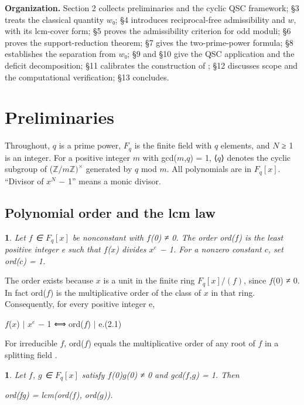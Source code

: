 \documentclass[pdflatex,sn-mathphys-num]{sn-jnl}
\theoremstyle{thmstyleone}
\newcommand{\thmxname}{}
\newtheorem*{thmxinner}{\thmxname}
\newenvironment{thmx}[1]{\renewcommand{\thmxname}{#1}\begin{thmxinner}}{\end{thmxinner}}
\theoremstyle{thmstylethree}
\newcommand{\defnname}{}
\newtheorem*{defninner}{\defnname}
\newenvironment{defn}[1]{\renewcommand{\defnname}{#1}\begin{defninner}}{\end{defninner}}
\begin{document}
\textbf{Organization.} Section 2 collects preliminaries and the cyclic QSC framework; §3 treats the classical quantity \(w\)₀; §4 introduces reciprocal-free admissibility and \(w\), with its lcm-cover form; §5 proves the admissibility criterion for odd moduli; §6 proves the support-reduction theorem; §7 gives the two-prime-power formula; §8 establishes the separation from \(w\)₀; §9 and §10 give the QSC application and the deficit decomposition; §11 calibrates the construction of \cite{LZ22}; §12 discusses scope and the computational verification; §13 concludes.

\section{Preliminaries}

Throughout, \(q\) is a prime power, \(F_q\) is the finite field with \(q\) elements, and \(N\) ≥ 1 is an integer. For a positive integer \(m\) with gcd(\(m\),\(q\)) = 1, ⟨\(q\)⟩ denotes the cyclic subgroup of (\(ℤ/mℤ)^×\) generated by \(q\) mod \(m\). All polynomials are in \(F_q[x]\). ``Divisor of \(x^N\) − 1'' means a monic divisor.

\subsection{Polynomial order and the lcm law}

\begin{defn}{Definition (order)}

Let \(f\) ∈ \(F_q[x]\) be nonconstant with \(f\)(0) ≠ 0. The \emph{order} ord(\(f\)) is the least positive integer e such that \(f\)(\(x\)) divides \(x^e\) − 1. For a nonzero constant \(c\), set ord(\(c\)) = 1.

\end{defn}

The order exists because \(x\) is a unit in the finite ring \(F_q[x]/(f)\), since \(f\)(0) ≠ 0. In fact ord(\(f\)) is the multiplicative order of the class of \(x\) in that ring. Consequently, for every positive integer e,

\begin{center}\(f\)(\(x\)) \(\mid\) \(x^e\) − 1 ⟺ ord(\(f\)) \(\mid\) e.\qquad (2.1)\end{center}

For irreducible \(f\), ord(\(f\)) equals the multiplicative order of any root of \(f\) in a splitting field \cite{LN}.

\begin{thmx}{Lemma 2.1 (lcm law)}

Let \(f\), \(g\) ∈ \(F_q[x]\) satisfy \(f\)(0)\(g\)(0) ≠ 0 and gcd(\(f\),\(g\)) = 1. Then

\begin{center}ord(fg) = lcm(ord(\(f\)), ord(\(g\))).\end{center}

\end{thmx}
\end{document}
